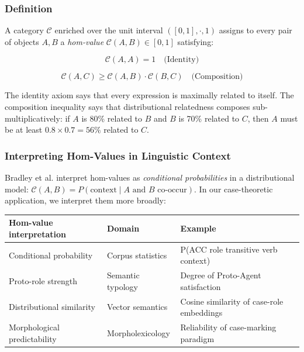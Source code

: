 \documentclass[
]{article}
\newcounter{none} %
\numberwithin{equation}{section}
\begin{document}
\subsubsection{Definition}\label{definition}

A category \(\mathcal{C}\) enriched over the unit interval
\(([0,1], \cdot, 1)\) assigns to every pair of objects \(A, B\) a
\emph{hom-value} \(\mathcal{C}(A, B) \in [0,1]\) satisfying:

\[\mathcal{C}(A, A) = 1 \quad \text{(Identity)} \tag{5.1}\]

\[\mathcal{C}(A, C) \geq \mathcal{C}(A, B) \cdot \mathcal{C}(B, C) \quad \text{(Composition)} \tag{5.2}\]

The identity axiom says that every expression is maximally related to
itself. The composition inequality says that distributional relatedness
composes sub-multiplicatively: if \(A\) is 80\% related to \(B\) and
\(B\) is 70\% related to \(C\), then \(A\) must be at least
\(0.8 \times 0.7 = 56\%\) related to \(C\).

\subsubsection{Interpreting Hom-Values in Linguistic
Context}\label{interpreting-hom-values-in-linguistic-context}

Bradley et al. \citeyearpar{fritz2021enriched} interpret hom-values as
\emph{conditional probabilities} in a distributional model:
\(\mathcal{C}(A, B) = P(\text{context} \mid A \text{ and } B \text{ co-occur})\).
In our case-theoretic application, we interpret them more broadly:

{\def\LTcaptype{none} %
\begin{longtable}[]{@{}
  >{\raggedright\arraybackslash}p{}
  >{\raggedright\arraybackslash}p{}
  >{\raggedright\arraybackslash}p{}@{}}
\toprule\noalign{}
\begin{minipage}[b]{\linewidth}\raggedright
Hom-value interpretation
\end{minipage} & \begin{minipage}[b]{\linewidth}\raggedright
Domain
\end{minipage} & \begin{minipage}[b]{\linewidth}\raggedright
Example
\end{minipage} \\
\midrule\noalign{}
\endhead
\bottomrule\noalign{}
\endlastfoot
Conditional probability & Corpus statistics & P(ACC role \mid{}
transitive verb context) \\
Proto-role strength & Semantic typology & Degree of Proto-Agent
satisfaction \\
Distributional similarity & Vector semantics & Cosine similarity of
case-role embeddings \\
Morphological predictability & Morpholexicology & Reliability of
case-marking paradigm \\
\end{longtable}
}
\end{document}
